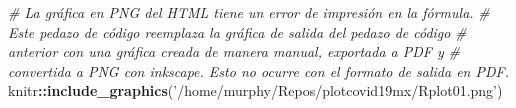 \documentclass[]{article}
\newenvironment{Shaded}{\begin{snugshade}}{\end{snugshade}}
\newcommand{\CommentTok}[1]{\textcolor[rgb]{0.56,0.35,0.01}{\textit{#1}}}
\newcommand{\KeywordTok}[1]{\textcolor[rgb]{0.13,0.29,0.53}{\textbf{#1}}}
\newcommand{\NormalTok}[1]{#1}
\newcommand{\OperatorTok}[1]{\textcolor[rgb]{0.81,0.36,0.00}{\textbf{#1}}}
\newcommand{\StringTok}[1]{\textcolor[rgb]{0.31,0.60,0.02}{#1}}
\begin{document}
\begin{Shaded}
\begin{Highlighting}[]
\CommentTok{# La gráfica en PNG del HTML tiene un error de impresión en la fórmula.}
\CommentTok{# Este pedazo de código reemplaza la gráfica de salida del pedazo de código }
\CommentTok{# anterior con una gráfica creada de manera manual, exportada a PDF y}
\CommentTok{# convertida a PNG con inkscape. Esto no ocurre con el formato de salida en PDF.}
\NormalTok{  knitr}\OperatorTok{::}\KeywordTok{include_graphics}\NormalTok{(}\StringTok{'/home/murphy/Repos/plotcovid19mx/Rplot01.png'}\NormalTok{)}
\end{Highlighting}
\end{Shaded}
\end{document}
